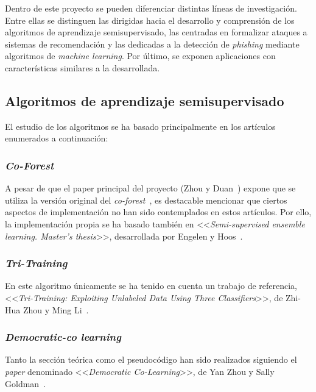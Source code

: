 
Dentro de este proyecto se pueden diferenciar distintas líneas de investigación. Entre ellas se distinguen las dirigidas hacia el desarrollo y comprensión de los algoritmos de aprendizaje semisupervisado, las centradas en formalizar ataques a sistemas de recomendación y las dedicadas a la detección de \textit{phishing} mediante algoritmos de \textit{machine learning}.  Por último, se exponen aplicaciones con características similares a la desarrollada.

\subsection{Algoritmos de aprendizaje semisupervisado}

El estudio de los algoritmos se ha basado principalmente en los artículos enumerados a continuación:

\subsubsection{\textit{Co-Forest}}

A pesar de que el paper principal del proyecto (Zhou y Duan~\cite{zhou2021SemisupervisedRecommendationAttack}) expone que se utiliza la versión original del \textit{co-forest}~\cite{originalCoForest2007}, es destacable mencionar que ciertos aspectos de implementación no han sido contemplados en estos artículos. Por ello, la implementación propia se ha basado también en <<\textit{Semi-supervised ensemble learning. Master’s thesis}>>, desarrollada por Engelen y Hoos~\cite{engelen2018thesis}.

\subsubsection{\textit{Tri-Training}}

En este algoritmo únicamente se ha tenido en cuenta un trabajo de referencia, <<\textit{Tri-Training: Exploiting Unlabeled Data Using Three Classifiers}>>, de Zhi-Hua Zhou y Ming Li~\cite{tritraining2005@original}.

\subsubsection{\textit{Democratic-co learning}}

Tanto la sección teórica como el pseudocódigo han sido realizados siguiendo el \textit{paper} denominado <<\textit{Democratic Co-Learning}>>, de Yan Zhou y Sally Goldman~\cite{democraticCoLearning2004original}.


